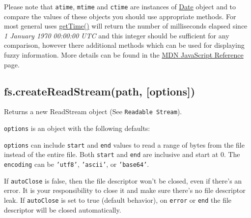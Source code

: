 Please note that \texttt{atime}, \texttt{mtime} and \texttt{ctime} are
instances of
\href{https://developer.mozilla.org/en/JavaScript/Reference/Global\_Objects/Date}{Date}
object and to compare the values of these objects you should use
appropriate methods. For most general uses
\href{https://developer.mozilla.org/en/JavaScript/Reference/Global\_Objects/Date/getTime}{getTime()}
will return the number of milliseconds elapsed since \emph{1 January
1970 00:00:00 UTC} and this integer should be sufficient for any
comparison, however there additional methods which can be used for
displaying fuzzy information. More details can be found in the
\href{https://developer.mozilla.org/en/JavaScript/Reference/Global\_Objects/Date}{MDN
JavaScript Reference} page.

\subsection{fs.createReadStream(path, {[}options{]})}

Returns a new ReadStream object (See \texttt{Readable Stream}).

\texttt{options} is an object with the following defaults:

\begin{Shaded}
\begin{Highlighting}[]
\NormalTok{\{ }\NormalTok{: }\NormalTok{,}
  \NormalTok{: }\NormalTok{,}
  \NormalTok{: } \NormalTok{* }\NormalTok{,}
  \NormalTok{: }
\NormalTok{\}}
\end{Highlighting}
\end{Shaded}

\texttt{options} can include \texttt{start} and \texttt{end} values to
read a range of bytes from the file instead of the entire file. Both
\texttt{start} and \texttt{end} are inclusive and start at 0. The
\texttt{encoding} can be \texttt{'utf8'}, \texttt{'ascii'}, or
\texttt{'base64'}.

If \texttt{autoClose} is false, then the file descriptor won't be
closed, even if there's an error. It is your responsibility to close it
and make sure there's no file descriptor leak. If \texttt{autoClose} is
set to true (default behavior), on \texttt{error} or \texttt{end} the
file descriptor will be closed automatically.

